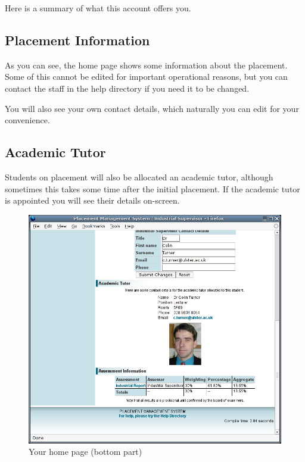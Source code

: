 Here is a summary of what this account offers you.

\subsection{Placement Information}

As you can see, the home page shows some information about the placement. Some of
this cannot be edited for important operational reasons, but you can contact the
staff in the help directory if you need it to be changed.

You will also see your own contact details, which naturally you can edit for your
convenience.

\subsection{Academic Tutor}

Students on placement will also be allocated an academic tutor, although sometimes
this takes some time after the initial placement. If the academic tutor is
appointed you will see their details on-screen.

\begin{figure}[htb]
\begin{center}
\includegraphics[scale=0.25]{png/supervisor_guide2.png}
\end{center}
\caption{Your home page (bottom part)}
\end{figure}

